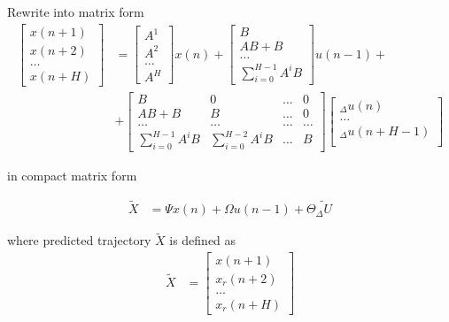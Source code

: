 \documentclass[12pt,twoside,onecolumn,openany,extrafontsizes,dvipsnames]{memoir}
\begin{document}
        Rewrite into matrix form
        \begin{align}
            \begin{bmatrix}
            x(n+1) \\
            x(n+2) \\
            \dots \\
            x(n+H)
            \end{bmatrix} &= 
            \begin{bmatrix}
            A^1 \\
            A^2 \\
            \dots \\
            A^H
            \end{bmatrix} x(n) +
            \begin{bmatrix}
            B \\
            AB + B \\
            \dots \\
            \sum_{i=0}^{H-1} A^iB
            \end{bmatrix} u(n-1) + \\
            &+
            \begin{bmatrix}
            B  & 0 & \dots & 0 \\
            AB + B & B & \dots & 0 \\
            \dots & \dots & \dots & \dots \\
            \sum_{i=0}^{H-1}A^iB & \sum_{i=0}^{H-2}A^iB & \dots & B
            \end{bmatrix}
            \begin{bmatrix}
            _\Delta u(n) \\
            \dots \\
            _\Delta u(n + H - 1) \\
            \end{bmatrix} \nonumber
            \label{eq:mpc_matrix_form} 
        \end{align}

        in compact matrix form

        \begin{align}
            \tilde{X} &= \Psi x(n) + \Omega u(n-1) + \Theta \tilde{_\Delta U}
        \end{align}
        
        where predicted trajectory $\tilde{X}$ is defined as
        \begin{align}   
            \tilde{X} &= \begin{bmatrix} x(n+1) \\ x_r(n+2) \\ ... \\ x_r(n+H) \end{bmatrix}
            \label{eq:predicted_trajectory}
        \end{align}
\end{document}
